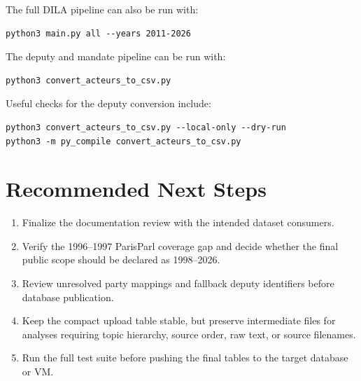 \documentclass[11pt,a4paper]{article}
\begin{document}
The full DILA pipeline can also be run with:

\begin{verbatim}
python3 main.py all --years 2011-2026
\end{verbatim}

The deputy and mandate pipeline can be run with:

\begin{verbatim}
python3 convert_acteurs_to_csv.py
\end{verbatim}

Useful checks for the deputy conversion include:

\begin{verbatim}
python3 convert_acteurs_to_csv.py --local-only --dry-run
python3 -m py_compile convert_acteurs_to_csv.py
\end{verbatim}

\section{Recommended Next Steps}

\begin{enumerate}
  \item Finalize the documentation review with the intended dataset consumers.
  \item Verify the 1996--1997 ParisParl coverage gap and decide whether the
  final public scope should be declared as 1998--2026.
  \item Review unresolved party mappings and fallback deputy identifiers before
  database publication.
  \item Keep the compact upload table stable, but preserve intermediate files
  for analyses requiring topic hierarchy, source order, raw text, or source
  filenames.
  \item Run the full test suite before pushing the final tables to the target
  database or VM.
\end{enumerate}
\end{document}
